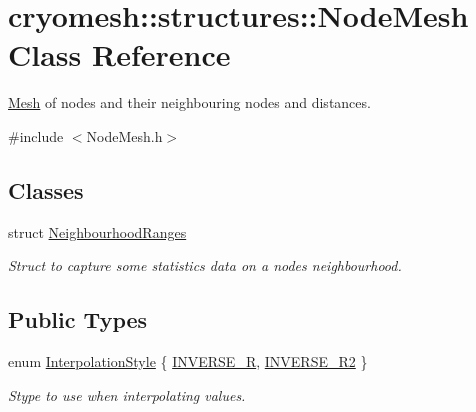 \hypertarget{classcryomesh_1_1structures_1_1NodeMesh}{\section{cryomesh\-:\-:structures\-:\-:\-Node\-Mesh \-Class \-Reference}
\label{classcryomesh_1_1structures_1_1NodeMesh}
}


\hyperlink{classcryomesh_1_1structures_1_1Mesh}{\-Mesh} of nodes and their neighbouring nodes and distances.  




{\ttfamily \#include $<$\-Node\-Mesh.\-h$>$}

\subsection*{\-Classes}
\begin{DoxyCompactItemize}
\item 
struct \hyperlink{structcryomesh_1_1structures_1_1NodeMesh_1_1NeighbourhoodRanges}{\-Neighbourhood\-Ranges}
\begin{DoxyCompactList}\small\item\em \-Struct to capture some statistics data on a nodes neighbourhood. \end{DoxyCompactList}\end{DoxyCompactItemize}
\subsection*{\-Public \-Types}
\begin{DoxyCompactItemize}
\item 
enum \hyperlink{classcryomesh_1_1structures_1_1NodeMesh_a2abd31c9553e8eea47b2f48f4128baa1}{\-Interpolation\-Style} \{ \hyperlink{classcryomesh_1_1structures_1_1NodeMesh_a2abd31c9553e8eea47b2f48f4128baa1a9c19702f5ebbdb27e8c729ea80ed4092}{\-I\-N\-V\-E\-R\-S\-E\-\_\-\-R}, 
\hyperlink{classcryomesh_1_1structures_1_1NodeMesh_a2abd31c9553e8eea47b2f48f4128baa1a074487093091d0a9da3ab11454a3ae86}{\-I\-N\-V\-E\-R\-S\-E\-\_\-\-R2}
 \}
\begin{DoxyCompactList}\small\item\em \-Stype to use when interpolating values. \end{DoxyCompactList}\end{DoxyCompactItemize}

